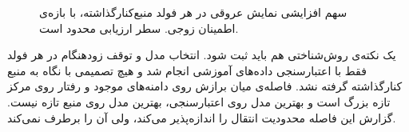 \begin{figure}[htbp]
  \centering
  \caption{سهم افزایشی نمایش عروقی در هر فولد منبع‌کنارگذاشته، با بازه‌ی اطمینان زوجی. سطر  ارزیابی محدود است.}
  
\end{figure}




یک نکته‌ی روش‌شناختی هم باید ثبت شود. انتخاب مدل و توقف زودهنگام در هر فولد فقط با اعتبارسنجی داده‌های آموزشی انجام شد و هیچ تصمیمی با نگاه به منبع کنارگذاشته گرفته نشد. فاصله‌ی میان برازش روی دامنه‌های موجود و رفتار روی مرکز تازه بزرگ است و بهترین مدل روی اعتبارسنجی، بهترین مدل روی منبع تازه نیست. گزارش این فاصله محدودیت انتقال را اندازه‌پذیر می‌کند، ولی آن را برطرف نمی‌کند.

